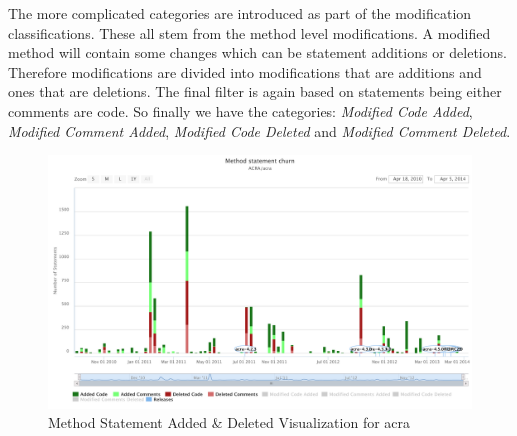 The more complicated categories are introduced as part of the modification classifications. These all stem from the method level modifications. A modified method will contain some changes which can be statement additions or deletions. Therefore modifications are divided into modifications that are additions and ones that are deletions. The final filter is again based on statements being either comments are code. So finally we have the categories: \textit{Modified Code Added}, \textit{Modified Comment Added}, \textit{Modified Code Deleted} and \textit{Modified Comment Deleted}.



\begin{landscape}
\thispagestyle{empty}
 \begin{figure}
  \centering
        \includegraphics[width=1.5\textwidth]{images/statement_add_delete}
    \caption{Method Statement Added \& Deleted Visualization for acra}
    \label{fig:statement_add_delete_visual_acra}
 \end{figure}
\end{landscape}
\thispagestyle{plain}

